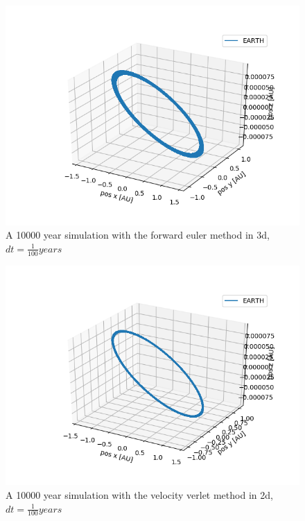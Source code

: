 \documentclass[a4paper]{article}
\begin{document}
\begin{figure}[h!]
	\centering 
	\includegraphics[scale=0.7]{fe1e4_3d.png}
	\caption{A 10000 year simulation with the forward euler method in 3d, $dt = \frac{1}{100}years$}
	\label{forw_eul2d}
\end{figure}
\begin{figure}[h!]
	\centering 
	\includegraphics[scale=0.7]{vv1e4_3d.png}
	\caption{A 10000 year simulation with the velocity verlet method in 2d, $dt = \frac{1}{100}years$}
	\label{computation time plot}
\end{figure}
\end{document}
